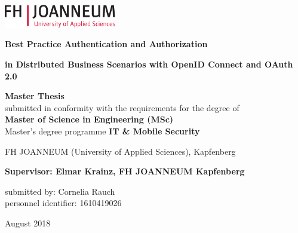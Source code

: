 \chapterend

\begin{titlepage}

\begin{center}
\includegraphics[height=1cm]{images/logo_FHJ_100mm_cmyk}
\hfill

\mbox{}\vfill

  \large

  {\huge\bf Best Practice Authentication and Authorization}
  
  \vspace{0.1cm}    
  {\small\bf in Distributed Business Scenarios with OpenID Connect and OAuth 2.0 }

  \vspace{2.0cm}

  {\bf Master Thesis}\\
submitted in conformity with the requirements for the degree of\\
{\bf Master of Science in Engineering (MSc)}\\
Master's degree programme {\bf IT \& Mobile Security\\}

  \vspace{0.5cm}

 FH JOANNEUM  (University of Applied Sciences), Kapfenberg

  \vspace{1.5cm}

  \mbox{}

  {\bf Supervisor: Elmar Krainz, FH JOANNEUM Kapfenberg

  submitted by: Cornelia Rauch\\
  personnel identifier: 1610419026}

  \vspace{1.5cm}

   August 2018

\end{center}
\vfill\mbox{}


\end{titlepage}



